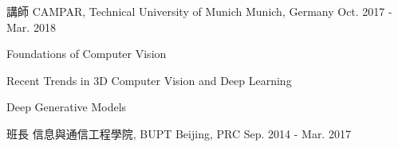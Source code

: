 


\begin{cventries}


\cventry
{講師} %
{CAMPAR, Technical University of Munich} %
{Munich, Germany} %
{Oct. 2017 - Mar. 2018} %
{ %
\begin{cvitems}
\item {Foundations of Computer Vision}
\item {Recent Trends in 3D Computer Vision and Deep Learning}
\item {Deep Generative Models}
\end{cvitems}
}

\cventry
{班長} %
{信息與通信工程學院, BUPT} %
{Beijing, PRC} %
{Sep. 2014 - Mar. 2017} %
{
}


\end{cventries}
